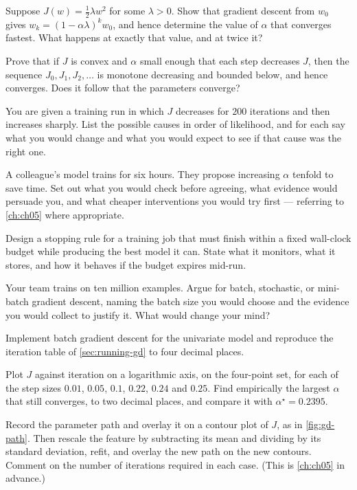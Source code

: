\ap Suppose $J(w) = \tfrac12 \lambda w^2$ for some $\lambda > 0$. Show that
gradient descent from $w_0$ gives $w_k = (1-\alpha\lambda)^k w_0$, and hence
determine the value of $\alpha$ that converges fastest. What happens at exactly
that value, and at twice it?

\ap Prove that if $J$ is convex and $\alpha$ small enough that each step
decreases $J$, then the sequence $J_0, J_1, J_2, \dots$ is monotone decreasing
and bounded below, and hence converges. Does it follow that the parameters
converge?


\dpr You are given a training run in which $J$ decreases for $200$ iterations and
then increases sharply. List the possible causes in order of likelihood, and for
each say what you would change and what you would expect to see if that cause
was the right one.

\dpr A colleague's model trains for six hours. They propose increasing $\alpha$
tenfold to save time. Set out what you would check before agreeing, what
evidence would persuade you, and what cheaper interventions you would try
first --- referring to \cref{ch:ch05} where appropriate.

\dpr Design a stopping rule for a training job that must finish within a fixed
wall-clock budget while producing the best model it can. State what it monitors,
what it stores, and how it behaves if the budget expires mid-run.

\dpr Your team trains on ten million examples. Argue for batch, stochastic, or
mini-batch gradient descent, naming the batch size you would choose and the
evidence you would collect to justify it. What would change your mind?


\pe Implement batch gradient descent for the univariate model and reproduce the
iteration table of \cref{sec:running-gd} to four decimal places.

\pe Plot $J$ against iteration on a logarithmic axis, on the four-point set, for
each of the step sizes $0.01$, $0.05$, $0.1$, $0.22$, $0.24$ and $0.25$. Find
empirically the largest $\alpha$ that still converges, to two decimal places,
and compare it with $\alpha^\star = 0.2395$.

\pe Record the parameter path and overlay it on a contour plot of $J$, as in
\cref{fig:gd-path}. Then rescale the feature by subtracting its mean and
dividing by its standard deviation, refit, and overlay the new path on the new
contours. Comment on the number of iterations required in each case. (This is
\cref{ch:ch05} in advance.)

